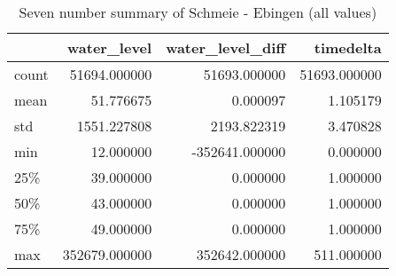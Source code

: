 \begin{table}
\centering
\caption{Seven number summary of Schmeie - Ebingen (all values)}
\label{table:auto-1003803-7-number-summary-all}
\begin{tabular}{lrrr}
\toprule
{} &    water\_level &  water\_level\_diff &     timedelta \\
\midrule
count &   51694.000000 &      51693.000000 &  51693.000000 \\
mean  &      51.776675 &          0.000097 &      1.105179 \\
std   &    1551.227808 &       2193.822319 &      3.470828 \\
min   &      12.000000 &    -352641.000000 &      0.000000 \\
25\%   &      39.000000 &          0.000000 &      1.000000 \\
50\%   &      43.000000 &          0.000000 &      1.000000 \\
75\%   &      49.000000 &          0.000000 &      1.000000 \\
max   &  352679.000000 &     352642.000000 &    511.000000 \\
\bottomrule
\end{tabular}
\end{table}

